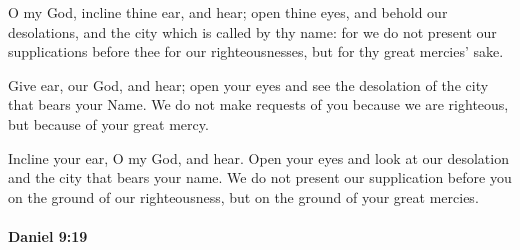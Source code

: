 			\begin{versebox}
					\item[BHS] 
					\item[LXX] 
					\item[ASV] O my God, incline thine ear, and hear; open thine eyes, and behold our desolations, and the city which is called by thy name: for we do not present our supplications before thee for our righteousnesses, but for thy great mercies' sake.
					\item[NIV] Give ear, our God, and hear; open your eyes and see the desolation of the city that bears your Name. We do not make requests of you because we are righteous, but because of your great mercy.
					\item[NRSV] Incline your ear, O my God, and hear. Open your eyes and look at our desolation and the city that bears your name. We do not present our supplication before you on the ground of our righteousness, but on the ground of your great mercies.
			\end{versebox}

		\paragraph{Daniel 9:19} %
			\label{DANIEL-9-19}

